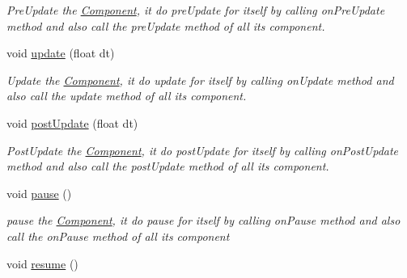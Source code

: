 \begin{DoxyCompactItemize}
\begin{DoxyCompactList}\small\item\em Pre\+Update the \hyperlink{class_i_dream_sky_1_1_component}{Component}, it do pre\+Update for itself by calling on\+Pre\+Update method and also call the pre\+Update method of all its component. \end{DoxyCompactList}\item 
void \hyperlink{class_i_dream_sky_1_1_component_1_1_owner_a2a5903c026526f83cfd5d0d808a3eecc}{update} (float dt)\hypertarget{class_i_dream_sky_1_1_component_1_1_owner_a2a5903c026526f83cfd5d0d808a3eecc}{}\label{class_i_dream_sky_1_1_component_1_1_owner_a2a5903c026526f83cfd5d0d808a3eecc}

\begin{DoxyCompactList}\small\item\em Update the \hyperlink{class_i_dream_sky_1_1_component}{Component}, it do update for itself by calling on\+Update method and also call the update method of all its component. \end{DoxyCompactList}\item 
void \hyperlink{class_i_dream_sky_1_1_component_1_1_owner_a8f796ed8887766aa49673abcffcba82f}{post\+Update} (float dt)\hypertarget{class_i_dream_sky_1_1_component_1_1_owner_a8f796ed8887766aa49673abcffcba82f}{}\label{class_i_dream_sky_1_1_component_1_1_owner_a8f796ed8887766aa49673abcffcba82f}

\begin{DoxyCompactList}\small\item\em Post\+Update the \hyperlink{class_i_dream_sky_1_1_component}{Component}, it do post\+Update for itself by calling on\+Post\+Update method and also call the post\+Update method of all its component. \end{DoxyCompactList}\item 
void \hyperlink{class_i_dream_sky_1_1_component_1_1_owner_a75d6556ec96115c162786b106e487f0a}{pause} ()\hypertarget{class_i_dream_sky_1_1_component_1_1_owner_a75d6556ec96115c162786b106e487f0a}{}\label{class_i_dream_sky_1_1_component_1_1_owner_a75d6556ec96115c162786b106e487f0a}

\begin{DoxyCompactList}\small\item\em pause the \hyperlink{class_i_dream_sky_1_1_component}{Component}, it do pause for itself by calling on\+Pause method and also call the on\+Pause method of all its component \end{DoxyCompactList}\item 
void \hyperlink{class_i_dream_sky_1_1_component_1_1_owner_ac2287e82a71a7d62586b09b1ec9d1280}{resume} ()\hypertarget{class_i_dream_sky_1_1_component_1_1_owner_ac2287e82a71a7d62586b09b1ec9d1280}{}\label{class_i_dream_sky_1_1_component_1_1_owner_ac2287e82a71a7d62586b09b1ec9d1280}


\end{DoxyCompactItemize}
